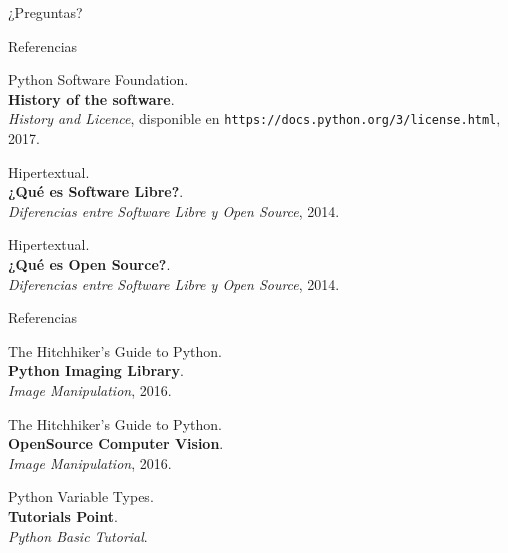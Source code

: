 \documentclass[usenames,dvipsnames]{beamer}
\begin{document}
  \begin{frame}[standout]
    ¿Preguntas?
  \end{frame}

  \begin{frame}{Referencias}
    \begin{enumerate}[{[}1{]}]
      \item Python Software Foundation.\\
      \textbf{History of the software}.\\
      \textit{History and Licence},
      disponible en \texttt{https://docs.python.org/3/license.html}, 2017.

      \item Hipertextual.\\
      \textbf{¿Qué es Software Libre?}.\\
      \textit{Diferencias entre Software Libre y Open Source}, 2014.

      \item Hipertextual.\\
      \textbf{¿Qué es Open Source?}.\\
      \textit{Diferencias entre Software Libre y Open Source}, 2014.
    \end{enumerate}
  \end{frame}

  \begin{frame}{Referencias}
    \begin{enumerate}[{[}1{]}]
      \addtocounter{enumi}{3}

      \item The Hitchhiker's Guide to Python.\\
      \textbf{Python Imaging Library}.\\
      \textit{Image Manipulation}, 2016.

      \item The Hitchhiker's Guide to Python.\\
      \textbf{OpenSource Computer Vision}.\\
      \textit{Image Manipulation}, 2016.

      \item Python Variable Types.\\
      \textbf{Tutorials Point}.\\
      \textit{Python Basic Tutorial}.
    \end{enumerate}
  \end{frame}
\end{document}
